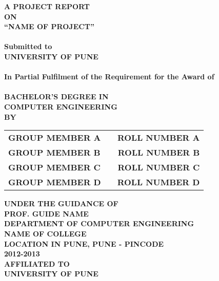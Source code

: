 \newpage
\begin{center}
\thispagestyle{empty}
\Large{\textbf{A PROJECT REPORT\\ \large{ON}}}\\[0.7cm]
\LARGE{\textsc {\textbf{``NAME OF PROJECT''}}}\\[0.5cm]
\vspace{0.5cm}
\Large{\textbf{\\Submitted to}}
\LARGE{\textbf{\\UNIVERSITY OF PUNE\\}}
\vspace{1cm}
\Large{\textbf{\\In Partial Fulfilment of the Requirement for the Award of\\}}
\Large{\textbf{\\BACHELOR'S DEGREE IN\\COMPUTER ENGINEERING}}
\vspace{1cm}
\Large{\textbf{\\BY}}\\[0.5cm]
\begin{table}[h]
\centering
\Large{
\begin{tabular}{>{\bfseries}lc>{\bfseries}r}
GROUP MEMBER A & & ROLL NUMBER A\\GROUP MEMBER B & & ROLL NUMBER B\\GROUP MEMBER C & & ROLL NUMBER C\\GROUP MEMBER D & & ROLL NUMBER D\\
\end{tabular}}
\end{table}
\vspace{0.5cm}
\large{\textbf{UNDER THE GUIDANCE OF}}\\
\large{\textbf{PROF. GUIDE NAME}}\\
\vspace{1cm}
\large{\textbf{DEPARTMENT OF COMPUTER ENGINEERING}}\\
\Large{\textbf{NAME OF COLLEGE}}\\
\large{\textbf{LOCATION IN PUNE, PUNE - PINCODE}}
\large{\textbf{\\2012-2013}}\\
\vspace{1cm}
\Large{\textbf{AFFILIATED TO\\}}
\LARGE{\textbf{UNIVERSITY OF PUNE}}
\newpage
\end{center}